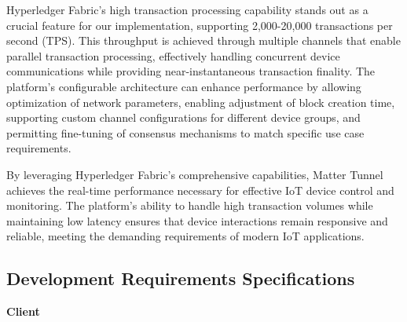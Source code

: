 \documentclass[conference]{IEEEtran}
\begin{document}
\begin{enumerate}[itemsep=2ex, parsep=1ex]
	      Hyperledger Fabric's high transaction processing capability stands out as
	      a crucial feature for our implementation, supporting 2,000-20,000 transactions
	      per second (TPS). This throughput is achieved through multiple channels
	      that enable parallel transaction processing, effectively handling concurrent
	      device communications while providing near-instantaneous transaction finality.
	      The platform's configurable architecture can enhance performance by
	      allowing optimization of network parameters, enabling adjustment of block creation
	      time, supporting custom channel configurations for different device groups,
	      and permitting fine-tuning of consensus mechanisms to match specific use case
	      requirements.
	      	      
	      By leveraging Hyperledger Fabric's comprehensive capabilities, Matter
	      Tunnel achieves the real-time performance necessary for effective IoT
	      device control and monitoring. The platform's ability to handle high transaction
	      volumes while maintaining low latency ensures that device interactions remain
	      responsive and reliable, meeting the demanding requirements of modern IoT
	      applications.
\end{enumerate}

\subsection{Development Requirements Specifications}
{\centering \textbf{Client} \par}
\end{document}
